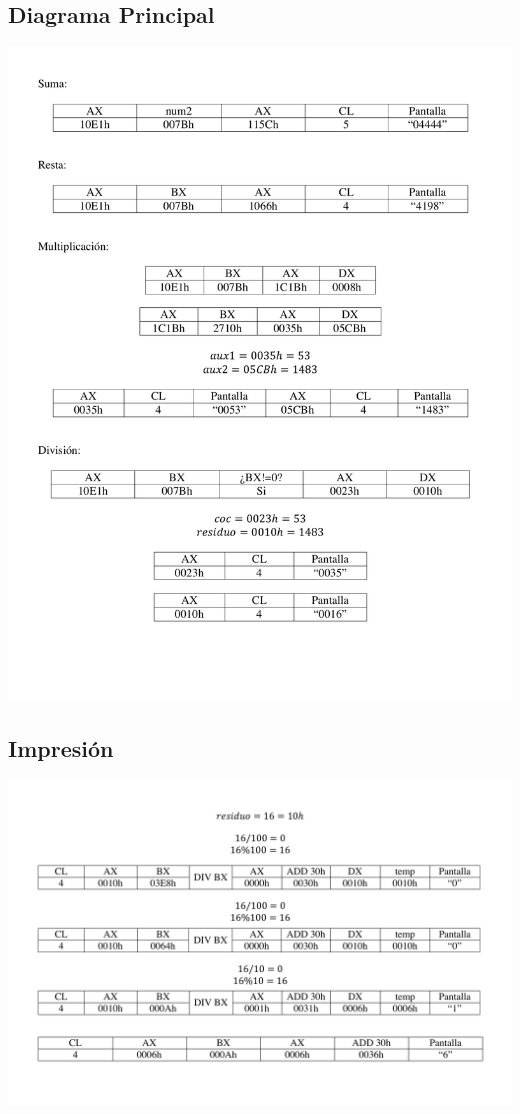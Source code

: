 \documentclass[letter,12 pt,titlepage]{article}
\begin{document}
    \subsection{Diagrama Principal}

    \includegraphics[width=1\textwidth]{img/Suma.pdf}

    \subsection{Impresión}

    \includegraphics[width=1\textwidth]{img/residuo.pdf}
    
\end{document}
